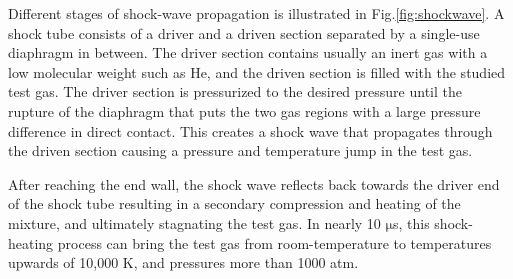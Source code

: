 Different stages of shock-wave propagation is illustrated in Fig.\ref{fig:shockwave}. A shock tube consists of a driver and a driven section separated by a single-use diaphragm in between. The driver section contains usually an inert gas with a low molecular weight such as He, and the driven section is filled with the studied test gas. The driver section is pressurized to the desired pressure until the rupture of the diaphragm that puts the two gas regions with a large pressure difference in direct contact. This creates a shock wave that propagates through the driven section causing a pressure and temperature jump in the test gas. 

After reaching the end wall, the shock wave reflects back towards the driver end of the shock tube resulting in a secondary compression and heating of the mixture, and ultimately stagnating the test gas. In nearly 10 $\mathrm{\mu}$s, this shock-heating process can bring the test gas from room-temperature to temperatures upwards of 10,000 K, and pressures more than 1000 atm.




